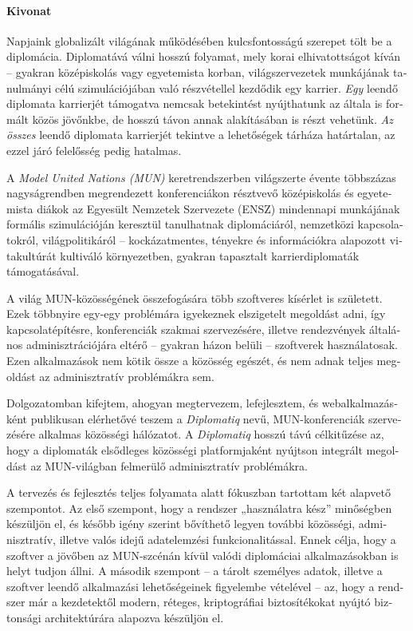 \begin{otherlanguage}{magyar}

\paragraph*{Kivonat}
{}
\thispagestyle{plain}

Napjaink globalizált világának működésében kulcsfontosságú szerepet tölt be a diplomácia. Diplomatává válni hosszú folyamat, mely korai elhivatottságot kíván – gyakran középiskolás vagy egyetemista korban, világszervezetek munkájának tanulmányi célú szimulációjában való részvétellel kezdődik egy karrier. \emph{Egy} leendő diplomata karrierjét támogatva nemcsak betekintést nyújthatunk az általa is formált közös jövőnkbe, de hosszú távon annak alakításában is részt vehetünk. \emph{Az összes} leendő diplomata karrierjét tekintve a lehetőségek tárháza határtalan, az ezzel járó felelősség pedig hatalmas.

A \emph{Model United Nations (MUN)} keretrendszerben világszerte évente többszázas nagyságrendben megrendezett konferenciákon résztvevő középiskolás és egyetemista diákok az Egyesült Nemzetek Szervezete (ENSZ) mindennapi munkájának formális szimulációján keresztül tanulhatnak diplomáciáról, nemzetközi kapcsolatokról, világpolitikáról – kockázatmentes, tényekre és információkra alapozott vitakultúrát kultiváló környezetben, gyakran tapasztalt karrierdiplomaták támogatásával.

A világ MUN-közösségének összefogására több szoftveres kísérlet is született. Ezek többnyire egy-egy problémára igyekeznek elszigetelt megoldást adni, így kapcsolatépítésre, konferenciák szakmai szervezésére, illetve rendezvények általános adminisztrációjára eltérő – gyakran házon belüli – szoftverek használatosak. Ezen alkalmazások nem kötik össze a közösség egészét, és nem adnak teljes megoldást az adminisztratív problémákra sem.

Dolgozatomban kifejtem, ahogyan megtervezem, lefejlesztem, és webalkalmazásként publikusan elérhetővé teszem a \emph{Diplomatiq} nevű, MUN-konferenciák szervezésére alkalmas közösségi hálózatot. A \emph{Diplomatiq} hosszú távú célkitűzése az, hogy a diplomaták elsődleges közösségi platformjaként nyújtson integrált megoldást az MUN-világban felmerülő adminisztratív problémákra.

A tervezés és fejlesztés teljes folyamata alatt fókuszban tartottam két alapvető szempontot. Az első szempont, hogy a rendszer „használatra kész” minőségben készüljön el, és később igény szerint bővíthető legyen további közösségi, adminisztratív, illetve valós idejű adatelemzési funkcionalitással. Ennek célja, hogy a szoftver a jövőben az MUN-szcénán kívül valódi diplomáciai alkalmazásokban is helyt tudjon állni. A második szempont – a tárolt személyes adatok, illetve a szoftver leendő alkalmazási lehetőségeinek figyelembe vételével – az, hogy a rendszer már a kezdetektől modern, réteges, kriptográfiai biztosítékokat nyújtó biztonsági architektúrára alapozva készüljön el.


\end{otherlanguage}
